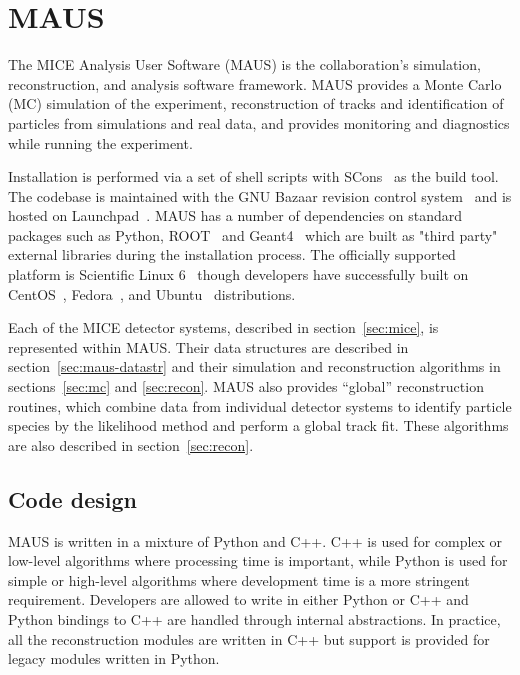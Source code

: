 \documentclass[11pt]{article}
\begin{document}

\section{MAUS}\label{sec:maus}

The MICE  Analysis User Software (MAUS) is the collaboration's simulation, reconstruction, and  analysis software framework. MAUS provides a Monte Carlo (MC) simulation of the experiment, reconstruction of tracks and identification of particles from simulations and real data, and provides monitoring and diagnostics while running the experiment.

Installation is performed via a set of shell scripts with SCons~\cite{SCONS} as the build tool. The codebase is maintained with  the GNU Bazaar revision control system~\cite{bazaar} and is hosted on Launchpad~\cite{launchpad}. MAUS has a number of dependencies on standard packages such as Python, ROOT~\cite{ROOT} and Geant4~\cite{GEANT4} which are built as "third party" external libraries during the installation process.  The officially supported platform is Scientific Linux 6~\cite{scilinux} though developers have successfully built on CentOS~\cite{centos}, Fedora~\cite{fedora}, and Ubuntu~\cite{ubuntu} distributions.

Each of the MICE detector systems, described in section~\ref{sec:mice}, is represented within MAUS. Their data structures are described in section~\ref{sec:maus-datastr} and their simulation and reconstruction algorithms in sections~\ref{sec:mc} and \ref{sec:recon}. MAUS also provides ``global'' reconstruction routines, which combine data from individual detector systems to identify particle species by the likelihood method and perform a global track fit. These algorithms are also described in section~\ref{sec:recon}. 


\subsection{Code design}\label{sec:maus-arch}

MAUS is written in a mixture of Python and C++. C++ is used for complex or low-level algorithms where processing time is important, while Python is used for simple or high-level algorithms where development time is a more stringent requirement. Developers are allowed to write in either Python or C++ and Python bindings to C++ are handled through internal abstractions. In practice, all the reconstruction modules are written in C++ but support is provided for legacy modules written in Python.
\end{document}

